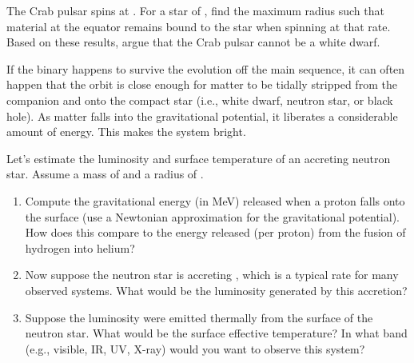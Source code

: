 \begin{exercisebox}
The Crab pulsar spins at . For a star of , find the maximum radius such that material at the equator remains bound to the star when spinning at that rate. Based on these results, argue that the Crab pulsar cannot be a white dwarf.
\end{exercisebox}

 If the binary happens to survive the evolution off the main sequence, it can often happen that the orbit is close enough for matter to be tidally stripped from the companion and  onto the compact star (i.e., white dwarf, neutron star, or black hole). As matter falls into the gravitational potential, it liberates a considerable amount of energy. This makes the system bright.

\begin{exercisebox}
Let's estimate the luminosity and surface temperature of an accreting neutron star.
Assume a mass of  and a radius of . 
\begin{enumerate}
\item Compute the gravitational energy (in MeV) released when a proton falls onto the surface (use a Newtonian approximation for the gravitational potential). How does this compare to the energy released (per proton) from the fusion of hydrogen into helium?
\item Now suppose the neutron star is accreting , which is a typical rate for many observed systems. What would be the luminosity generated by this accretion? 
\item Suppose the luminosity were emitted thermally from the surface of the neutron star. What would be the surface effective temperature? In what band (e.g., visible, IR, UV, X-ray) would you want to observe this system?
\end{enumerate}
\end{exercisebox}

